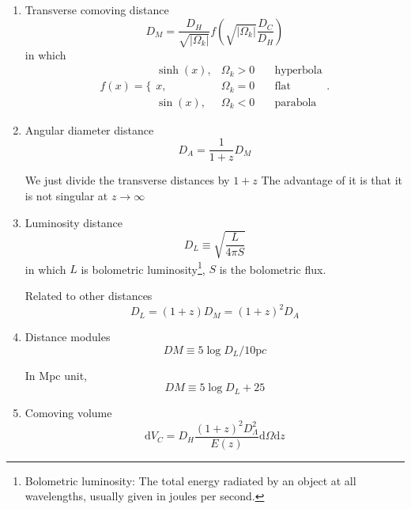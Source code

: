\begin{enumerate}
\item
Transverse comoving distance
\begin{equation}
D_M = \frac{D_H}{\sqrt{\left\vert\Omega_k\right\vert}} f(\sqrt{\left\vert \Omega_k \right\vert}\frac {D_C}{D_H})
\end{equation}
in which 
\begin{equation}
f(x) = \Big\{
\begin{array}{lll}
\sinh(x), & \Omega_k>0 \quad &\text{hyperbola}\\
x, & \Omega_k = 0 &\text{flat}\\
\sin(x), & \Omega_k<0 &\text{parabola}
\end{array} .
\end{equation}


\item
Angular diameter distance
\begin{equation}
	D_A = \frac {1}{1+z} D_M
\end{equation}

We just divide the transverse distances by $1+z$
The advantage of it is that it is not singular at $z\rightarrow\infty$

\item
Luminosity distance
\begin{equation}
	D_L\equiv \sqrt{\frac{L}{4\pi S}}
\end{equation}
in which $L$ is bolometric luminosity\footnote{Bolometric luminosity: The total energy radiated by an object at all wavelengths, usually given in joules per second.}, $S$ is the bolometric flux.

Related to other distances
\begin{equation}
	D_L = (1+z)D_M = (1+z)^2 D_A
\end{equation}

\item
Distance modules
\begin{equation}
	DM \equiv 5 \log{D_L/10\mathrm pc}
\end{equation}

In Mpc unit,
\begin{equation}
	DM \equiv 5 \log{D_L} + 25
\end{equation}

\item
Comoving volume
\begin{equation}
	\mathrm dV_C = D_H \frac{(1+z)^2D_\Lambda^2}{E(z)}\mathrm d\Omega \mathrm dz
\end{equation}


\end{enumerate}
